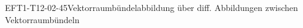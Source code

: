 
\begin{DEF}{EFT1-T12-02-45}{Vektorraumbündelabbildung über diff. Abbildungen zwischen Vektorraumbündeln}
\end{DEF}
